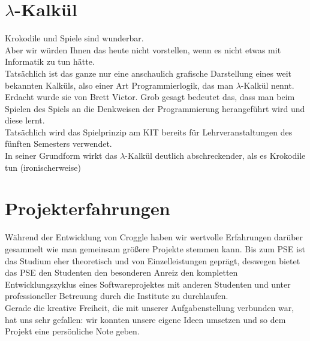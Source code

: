 \documentclass{scrartcl}
\begin{document}
	\section{$\lambda$-Kalkül}
	Krokodile und Spiele sind wunderbar.\\
	Aber wir würden Ihnen das heute nicht vorstellen, wenn es nicht etwas mit Informatik zu tun hätte.\\
	Tatsächlich ist das ganze nur eine anschaulich grafische Darstellung eines weit bekannten Kalküls, also einer Art Programmierlogik, das man $\lambda$-Kalkül nennt.\\
	Erdacht wurde sie von Brett Victor.
	Grob gesagt bedeutet das, dass man beim Spielen des Spiels an die Denkweisen der Programmierung herangeführt wird und diese lernt.\\
	Tatsächlich wird das Spielprinzip am KIT bereits für Lehrveranstaltungen des fünften Semesters verwendet.\\
	In seiner Grundform wirkt das $\lambda$-Kalkül deutlich abschreckender, als es Krokodile tun (ironischerweise)\\
	
	\section{Projekterfahrungen}

	Während der Entwicklung von Croggle haben wir wertvolle Erfahrungen darüber gesammelt wie man gemeinsam größere Projekte stemmen kann. Bis zum PSE ist das Studium eher theoretisch und von Einzelleistungen geprägt, deswegen bietet das PSE den Studenten den besonderen Anreiz den kompletten Entwicklungszyklus eines Softwareprojektes mit anderen Studenten und unter professioneller Betreuung durch die Institute zu durchlaufen. \\
	Gerade die kreative Freiheit, die mit unserer Aufgabenstellung verbunden war, hat uns sehr gefallen: wir konnten unsere eigene Ideen umsetzen und so dem Projekt eine persönliche Note geben. \\

	
\end{document}

